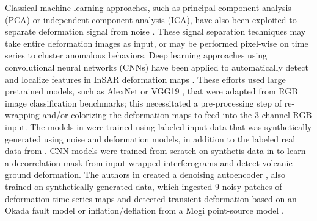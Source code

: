 Classical machine learning approaches, such as principal component analysis (PCA) or independent component analysis (ICA), have also been exploited to separate deformation signal from noise \citep{Chaussard2014PredictabilityHydraulicHead, Ebmeier2016ApplicationIndependentComponent, Gaddes2018BlindSignalSeparation}. 
These signal separation techniques may take entire deformation images as input, or may be performed pixel-wise on time series to cluster anomalous behaviors.
Deep learning approaches using convolutional neural networks (CNNs) have been applied to automatically detect and localize features in InSAR deformation maps \cite{Anantrasirichai2018ApplicationMachineLearning, Anantrasirichai2019ApplicationConvolutionalNeural, Anantrasirichai2019DeepLearningApproach, Anantrasirichai2021DetectingGroundDeformation}.
These efforts used large pretrained models, such as AlexNet \cite{Krizhevsky2012ImagenetClassificationDeep} or VGG19 \cite{Simonyan2014VeryDeepConvolutional}, that were adapted from RGB image classification benchmarks; this necessitated a pre-processing step of re-wrapping and/or colorizing the deformation maps to feed into the 3-channel RGB input. The models in \cite{Anantrasirichai2019DeepLearningApproach} were trained using labeled input data that was synthetically generated using noise and deformation models, in addition to the labeled real data from \cite{Anantrasirichai2018ApplicationMachineLearning}.
CNN models were trained from scratch on synthetis data in \cite{Valade2019TowardsGlobalVolcano}
to learn a decorrelation mask from input wrapped interferograms and detect volcanic ground deformation.  The authors in \cite{RouetLeduc2021AutonomousExtractionMillimeter} created a denoising autoencoder \cite{Vincent2008ExtractingComposingRobust}, also trained on synthetically generated data, which ingested 9 noisy patches of deformation time series maps and detected transient deformation based on an Okada fault model \cite{Okada1992InternalDeformationDue} or inflation/deflation from a Mogi point-source model \cite{Mogi1958RelationsEruptionsVarious}.



